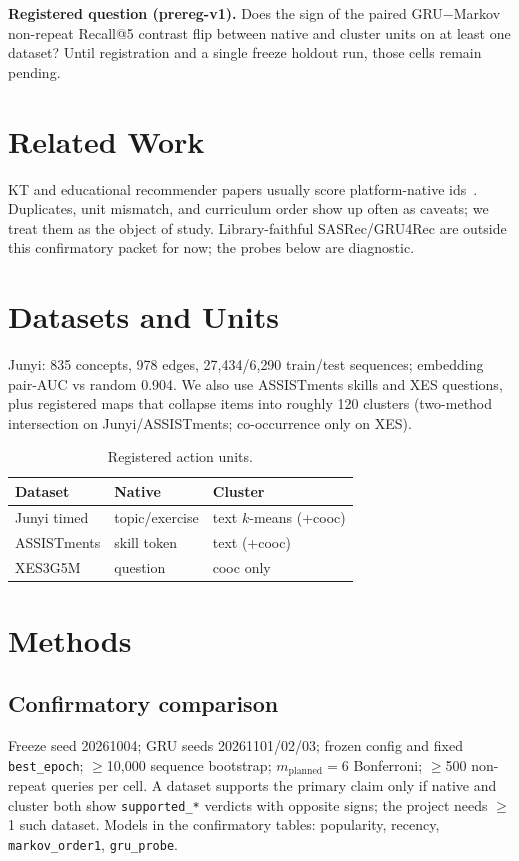 \documentclass[conference,a4paper]{IEEEtran}
\begin{document}
\noindent\textbf{Registered question (prereg-v1).}
Does the sign of the paired GRU$-$Markov non-repeat Recall@5 contrast flip between native and cluster units on at least one dataset?
Until registration and a single freeze holdout run, those cells remain pending.

\section{Related Work}
KT and educational recommender papers usually score platform-native ids~\cite{hidasi2016,kang2018}.
Duplicates, unit mismatch, and curriculum order show up often as caveats; we treat them as the object of study.
Library-faithful SASRec/GRU4Rec are outside this confirmatory packet for now; the probes below are diagnostic.

\section{Datasets and Units}
Junyi: 835 concepts, 978 edges, 27{,}434/6{,}290 train/test sequences; embedding pair-AUC vs random 0.904.
We also use ASSISTments skills and XES questions, plus registered maps that collapse items into roughly 120 clusters (two-method intersection on Junyi/ASSISTments; co-occurrence only on XES).

\begin{table}[t]
\centering
\caption{Registered action units.}
\label{tab:units}
\begin{tabular}{@{}lll@{}}
\toprule
Dataset & Native & Cluster \\
\midrule
Junyi timed & topic/exercise & text $k$-means (+cooc) \\
ASSISTments & skill token & text (+cooc) \\
XES3G5M & question & cooc only \\
\bottomrule
\end{tabular}
\end{table}

\section{Methods}
\subsection{Confirmatory comparison}
Freeze seed 20261004; GRU seeds 20261101/02/03; frozen config and fixed \texttt{best\_epoch}; $\ge$10{,}000 sequence bootstrap; $m_{\mathrm{planned}}=6$ Bonferroni; $\ge$500 non-repeat queries per cell.
A dataset supports the primary claim only if native and cluster both show \texttt{supported\_*} verdicts with opposite signs; the project needs $\ge$1 such dataset.
Models in the confirmatory tables: popularity, recency, \texttt{markov\_order1}, \texttt{gru\_probe}.
\end{document}
